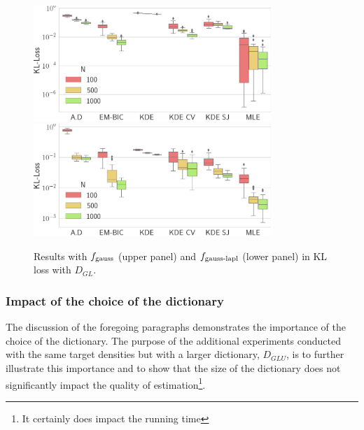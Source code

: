 \begin{figure}
\center
    \includegraphics[width=0.8\textwidth]{./TeX_files/res_gauss_KL_GL.png}
    \includegraphics[width=0.8\textwidth]{./TeX_files/res_lapl_gauss_KL_GL.png}
    \caption{Results with $f_{\textnormal{gauss}}$ (upper panel) and $f_{\textnormal{gauss-lapl}}$ 
    (lower panel) in KL loss with $D_{GL}$.}
    \label{fig:res_lapl_gauss_KL_GL}
\end{figure}


\subsubsection{Impact of the choice of the dictionary \label{dict_dglu_sect}}

The discussion of the foregoing paragraphs demonstrates the importance of the choice of the dictionary.
The purpose of the additional experiments conducted with the same target densities but with a larger dictionary, $D_{GLU}$,
is to further illustrate this importance and to show that the size of the dictionary does not significantly impact 
the quality of estimation\footnote{It certainly does impact the running time}.

